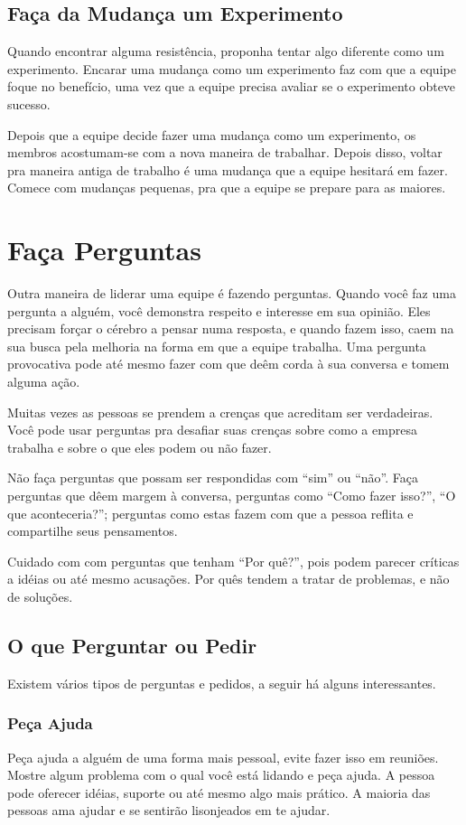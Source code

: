 \documentclass[a4paper, 10pt, font=plain]{abnt}
\begin{document}
\subsection{Faça da Mudança um Experimento}
Quando encontrar alguma resistência, proponha tentar algo diferente como um experimento. Encarar uma mudança como um experimento faz com que a equipe foque no benefício, uma vez que a equipe precisa avaliar se o experimento obteve sucesso.

Depois que a equipe decide fazer uma mudança como um experimento, os membros acostumam-se com a nova maneira de trabalhar. Depois disso, voltar pra maneira antiga de trabalho é uma mudança que a equipe hesitará em fazer. Comece com mudanças pequenas, pra que a equipe se prepare para as maiores.

\section{Faça Perguntas}
Outra maneira de liderar uma equipe é fazendo perguntas. Quando você faz uma pergunta a alguém, você demonstra respeito e interesse em sua opinião. Eles precisam forçar o cérebro a pensar numa resposta, e quando fazem isso, caem na sua busca pela melhoria na forma em que a equipe trabalha. Uma pergunta provocativa pode até mesmo fazer com que deêm corda à sua conversa e tomem alguma ação.

Muitas vezes as pessoas se prendem a crenças que acreditam ser verdadeiras. Você pode usar perguntas pra desafiar suas crenças sobre como a empresa trabalha e sobre o que eles podem ou não fazer.

Não faça perguntas que possam ser respondidas com ``sim'' ou ``não''. Faça perguntas que dêem margem à conversa, perguntas como ``Como fazer isso?'', ``O que aconteceria?''; perguntas como estas fazem com que a pessoa reflita e compartilhe seus pensamentos.

Cuidado com com perguntas que tenham ``Por quê?'', pois podem parecer críticas a idéias ou até mesmo acusações. Por quês tendem a tratar de problemas, e não de soluções.

\subsection{O que Perguntar ou Pedir}
Existem vários tipos de perguntas e pedidos, a seguir há alguns interessantes.

\subsubsection{Peça Ajuda}
Peça ajuda a alguém de uma forma mais pessoal, evite fazer isso em reuniões. Mostre algum problema com o qual você está lidando e peça ajuda. A pessoa pode oferecer idéias, suporte ou até mesmo algo mais prático. A maioria das pessoas ama ajudar e se sentirão lisonjeados em te ajudar.
\end{document}

